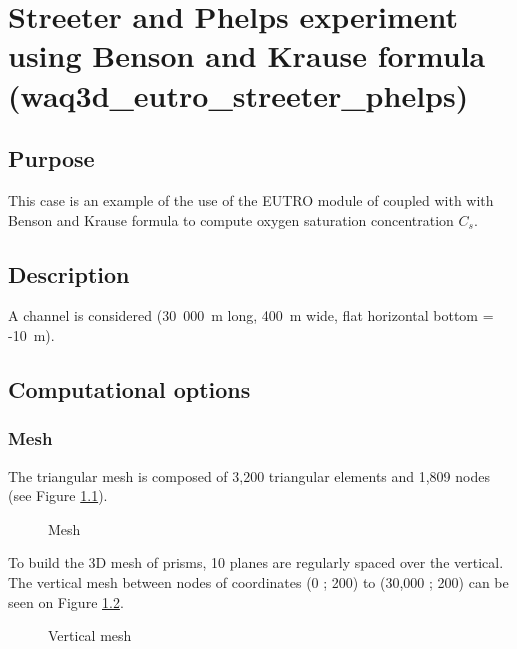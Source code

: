 \chapter{Streeter and Phelps experiment using Benson and Krause formula
(waq3d\_eutro\_streeter\_phelps)}

\section{Purpose}

This case is an example of the use of the EUTRO module of \waqtel coupled with
 with Benson and Krause formula to compute oxygen saturation
concentration $C_s$.

\section{Description}

A channel is considered (30~000~m long, 400~m wide, flat horizontal bottom
= -10~m).\\

\section{Computational options}

\subsection{Mesh}

The triangular mesh is composed of 3,200 triangular elements and 1,809 nodes
(see Figure \ref{fig:waq3d_eutro_streeter_phelps:mesh}).

\begin{figure}[H]
 \centering
\caption{Mesh}
 \label{fig:waq3d_eutro_streeter_phelps:mesh}
\end{figure}

To build the 3D mesh of prisms, 10 planes are regularly spaced over the vertical.
The vertical mesh between nodes of coordinates (0 ; 200) to (30,000 ; 200) can be
seen on Figure \ref{fig:waq3d_eutro_streeter_phelps:mesh_section}.

\begin{figure}[H]
 \centering
\caption{Vertical mesh}
 \label{fig:waq3d_eutro_streeter_phelps:mesh_section}
\end{figure}

